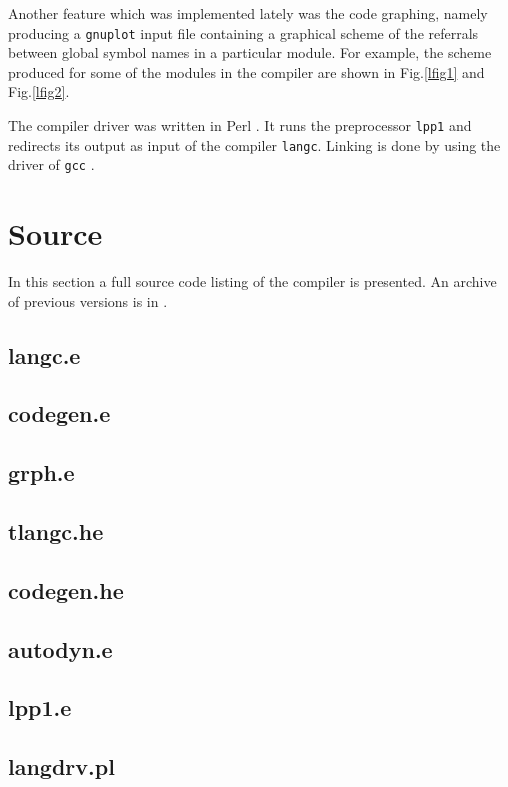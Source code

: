 \documentclass[10pt]{article}
\begin{document}
Another feature which was implemented lately was the code graphing,
namely producing a \verb+gnuplot+ \cite{GnuPlot} input file containing a
graphical 
scheme of the referrals between global symbol names in a particular
module. For example, the scheme produced for some of the modules in
the compiler are shown in  Fig.\ref{lfig1} and Fig.\ref{lfig2}.


The compiler driver was written in Perl \cite{PerlOrg}. It runs the
preprocessor \texttt{lpp1} 
and redirects its output as input of the compiler
\texttt{langc}. Linking is done by using the driver of \texttt{gcc}
\cite{GNUCC}. 

\section{Source}
In this section a full source code listing of the compiler is
presented. An archive of previous versions is in \cite{UPLNChome}.
\subsection{langc.e}

\subsection{codegen.e}

\subsection{grph.e}

\subsection{tlangc.he}

\subsection{codegen.he}

\subsection{autodyn.e}

\subsection{lpp1.e}

\subsection{langdrv.pl}

\end{document}
